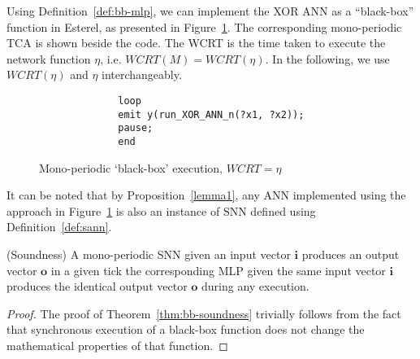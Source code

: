 Using Definition~\ref{def:bb-mlp}, we can implement the XOR \ac{ANN} as a ``black-box'' function in Esterel, as presented in Figure~\ref{fig:tca-bb-n}. 
The corresponding mono-periodic \ac{TCA} is shown beside the code.
The \ac{WCRT} is the time taken to execute the network function
$\eta$, i.e. $WCRT\left(M\right) = WCRT\left( \eta\right)$. 
In the following, we use $WCRT(\eta)$ and $\eta$ interchangeably.

\begin{figure}[h]
	\centering
	\begin{subfigure}[h]{0.15\textwidth}
		\centering
		
	\end{subfigure}%
	\begin{subfigure}[h]{0.33\textwidth}
		\vspace{3mm}
		\begin{lstlisting}
		loop
		emit y(run_XOR_ANN_n(?x1, ?x2));
		pause;
		end
		\end{lstlisting}
	\end{subfigure}
	\caption{Mono-periodic `black-box' execution, $WCRT = \eta$}
	\label{fig:tca-bb-n}
\end{figure}

It can be noted that by Proposition~\ref{lemma1}, any \ac{ANN} implemented using the approach in Figure~\ref{fig:tca-bb-n} is also an instance of \ac{SNN} defined using Definition~\ref{def:sann}.

\begin{theorem}
	\label{thm:bb-soundness}
	(Soundness) A mono-periodic \ac{SNN} given an input vector $\mathbf{i}$
	produces an output vector $\mathbf{o}$ in a given tick \miff the corresponding \ac{MLP} 
	given the same input vector $\mathbf{i}$ produces the identical output vector $\mathbf{o}$ during any execution.
	
\end{theorem}

\begin{proof}
	The proof of Theorem~\ref{thm:bb-soundness} trivially follows from the
	fact that synchronous execution of a black-box function does not change
	the mathematical properties of that function. %
\end{proof}

